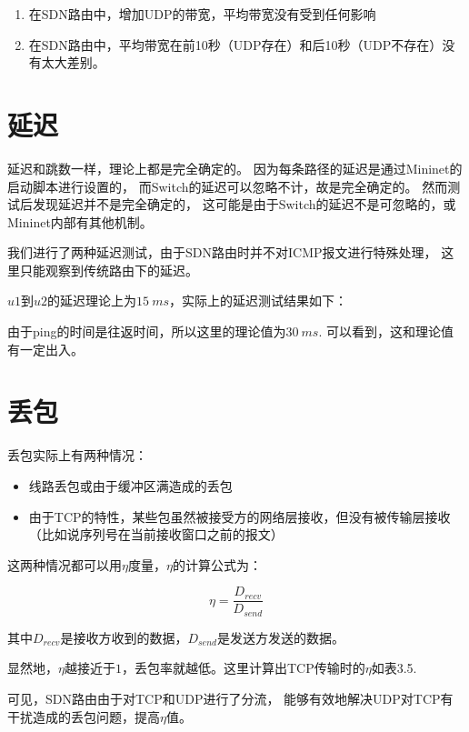 \begin{enumerate}
  \item 在SDN路由中，增加UDP的带宽，平均带宽没有受到任何影响
  \item 在SDN路由中，平均带宽在前10秒（UDP存在）和后10秒（UDP不存在）没有太大差别。
\end{enumerate}

\section{延迟}

延迟和跳数一样，理论上都是完全确定的。
因为每条路径的延迟是通过Mininet的启动脚本进行设置的，
而Switch的延迟可以忽略不计，故是完全确定的。
然而测试后发现延迟并不是完全确定的，
这可能是由于Switch的延迟不是可忽略的，或Mininet内部有其他机制。

我们进行了两种延迟测试，由于SDN路由时并不对ICMP报文进行特殊处理，
这里只能观察到传统路由下的延迟。

$u1$到$u2$的延迟理论上为$15\ ms$，实际上的延迟测试结果如下：



由于ping的时间是往返时间，所以这里的理论值为$30\ ms$. 
可以看到，这和理论值有一定出入。

\section{丢包}

丢包实际上有两种情况：

\begin{itemize}
  \item 线路丢包或由于缓冲区满造成的丢包
  \item 由于TCP的特性，某些包虽然被接受方的网络层接收，但没有被传输层接收
  （比如说序列号在当前接收窗口之前的报文）
\end{itemize}

这两种情况都可以用$\eta$度量，$\eta$的计算公式为：

$$\eta = \frac{D_{recv}}{D_{send}}$$

其中$D_{recv}$是接收方收到的数据，$D_{send}$是发送方发送的数据。

显然地，$\eta$越接近于$1$，丢包率就越低。这里计算出TCP传输时的$\eta$如表3.5.

可见，SDN路由由于对TCP和UDP进行了分流，
能够有效地解决UDP对TCP有干扰造成的丢包问题，提高$\eta$值。



